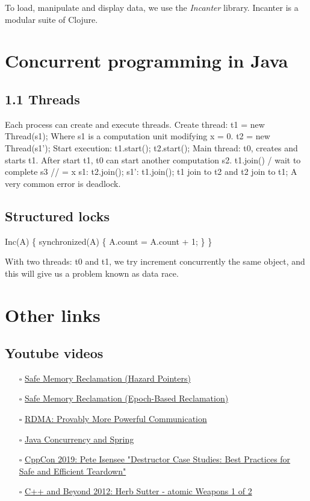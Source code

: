 \documentclass[openany, a4paper]{book}
\theoremstyle{plain}
\theoremstyle{definition}
\theoremstyle{remark}
\begin{document}
To load, manipulate and display data, we use the \emph{Incanter} library. Incanter
is a modular suite of Clojure.


\chapter{Concurrent programming in Java}
\label{sec:org1919f37}

\section{1.1 Threads}
\label{sec:org31d4aa2}
Each process can create and execute threads.
Create thread: t1 = new Thread(s1); Where s1 is a computation unit modifying x
= 0.
t2 = new Thread(s1');
Start execution: t1.start(); t2.start();
Main thread: t0, creates and starts t1. After start t1, t0 can start another
computation s2.
t1.join() / wait to complete
s3 // = x
s1: t2.join();
s1': t1.join();
t1 join to t2 and t2 join to t1;
A very common error is deadlock.

\section{Structured locks}
\label{sec:org2fddfa0}

Inc(A) \{
  synchronized(A) \{
    A.count = A.count + 1;
  \}
\}

With two threads: t0 and t1, we try increment concurrently the same object,
and this will give us a problem known as data race.


\chapter{Other links}
\label{sec:org49c0ef1}

\section{Youtube videos}
\label{sec:org07b5f5c}

\begin{itemize}
\item[{$\square$}] \href{https://www.youtube.com/watch?v=drXrIVfBKaQ}{Safe Memory Reclamation (Hazard Pointers)}
\item[{$\square$}] \href{https://www.youtube.com/watch?v=cYDMq5FOiw4}{Safe Memory Reclamation (Epoch-Based Reclamation)}
\item[{$\square$}] \href{https://www.microsoft.com/en-us/research/video/rdma-provably-more-powerful-communication/}{RDMA: Provably More Powerful Communication}
\item[{$\square$}] \href{https://www.youtube.com/watch?v=FYvoBi89wsE}{Java Concurrency and Spring}
\item[{$\square$}] \href{https://www.youtube.com/watch?v=XvWyLAW\_U0Q}{CppCon 2019: Pete Isensee "Destructor Case Studies: Best Practices for
Safe and Efficient Teardown"}
\item[{$\square$}] \href{https://www.youtube.com/watch?app=desktop\&v=A8eCGOqgvH4}{C++ and Beyond 2012: Herb Sutter - atomic Weapons 1 of 2}
\end{itemize}
\end{document}
